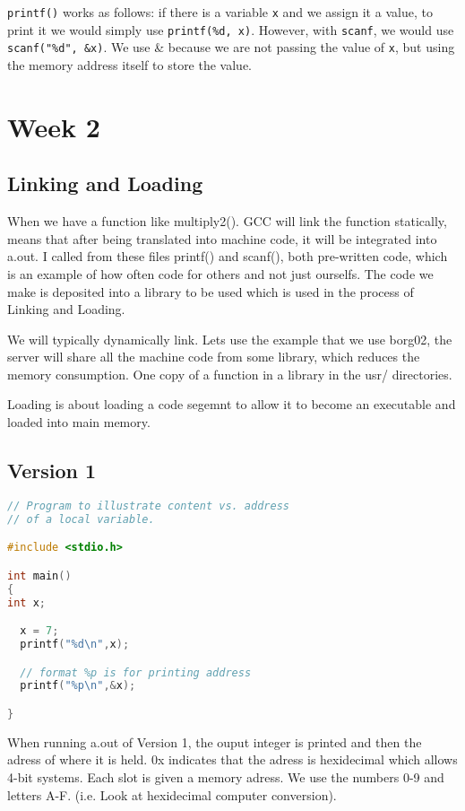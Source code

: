 \documentclass{article}
\begin{document}
\texttt{printf()} works as follows: if there is a variable \texttt{x} and we assign it a value, to print it we would simply use \texttt{printf(\%d, x)}. However, with \texttt{scanf}, we would use \texttt{scanf("\%d", \&x)}. We use \& because we are not passing the value of \texttt{x}, but using the memory address itself to store the value.

\newpage
\section*{Week 2}
\subsection*{Linking and Loading}

    When we have a function like multiply2(). GCC will link the function statically, means that after being translated into machine code, it will be integrated into a.out. I called from these files printf() and scanf(), both pre-written code, which is an example of how often code for others and not just ourselfs. The code we make is deposited into a library to be used which is used in the process of Linking and Loading.

    We will typically dynamically link. Lets use the example that we use borg02, the server will share all the machine code from some library, which reduces the memory consumption. One copy of a function in a library in the usr/ directories.

    Loading is about loading a code segemnt to allow it to become an executable and loaded into main memory.

    \subsection*{Version 1}
    \begin{lstlisting}[language=C]
// Program to illustrate content vs. address
// of a local variable.

#include <stdio.h>

int main()
{
int x;

  x = 7;
  printf("%d\n",x);

  // format %p is for printing address
  printf("%p\n",&x);

}
    \end{lstlisting}

    When running a.out of Version 1, the ouput integer is printed and then the adress of where it is held. 0x indicates that the adress is hexidecimal which allows 4-bit systems. Each slot is given a memory adress. We use the numbers 0-9 and letters A-F. (i.e. Look at hexidecimal computer conversion).
\end{document}
